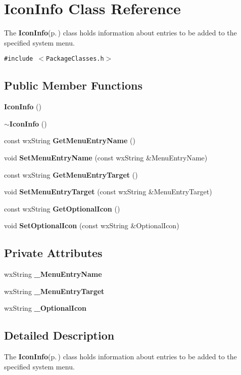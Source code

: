 \section{Icon\-Info Class Reference}
\label{class_icon_info}
The {\bf Icon\-Info}{\rm (p.\,\pageref{class_icon_info})} class holds information about entries to be added to the specified system menu.  


{\tt \#include $<$Package\-Classes.h$>$}

\subsection*{Public Member Functions}
\begin{CompactItemize}
\item 
{\bf Icon\-Info} ()
\item 
{\bf $\sim$Icon\-Info} ()
\item 
const wx\-String {\bf Get\-Menu\-Entry\-Name} ()
\item 
void {\bf Set\-Menu\-Entry\-Name} (const wx\-String \&Menu\-Entry\-Name)
\item 
const wx\-String {\bf Get\-Menu\-Entry\-Target} ()
\item 
void {\bf Set\-Menu\-Entry\-Target} (const wx\-String \&Menu\-Entry\-Target)
\item 
const wx\-String {\bf Get\-Optional\-Icon} ()
\item 
void {\bf Set\-Optional\-Icon} (const wx\-String \&Optional\-Icon)
\end{CompactItemize}
\subsection*{Private Attributes}
\begin{CompactItemize}
\item 
wx\-String {\bf \_\-Menu\-Entry\-Name}
\item 
wx\-String {\bf \_\-Menu\-Entry\-Target}
\item 
wx\-String {\bf \_\-Optional\-Icon}
\end{CompactItemize}


\subsection{Detailed Description}
The {\bf Icon\-Info}{\rm (p.\,\pageref{class_icon_info})} class holds information about entries to be added to the specified system menu. 

